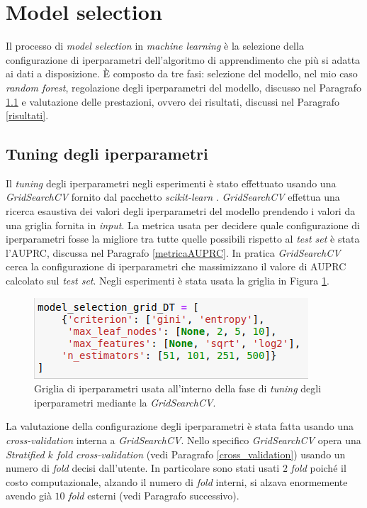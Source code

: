 \documentclass[12pt,italian]{report}
\begin{document}
	
	\section{Model selection}
	Il processo di \textit{model selection} in \textit{machine learning} è la selezione della configurazione di iperparametri dell'algoritmo di apprendimento che più si adatta ai dati a disposizione. È composto da tre fasi: selezione del modello, nel mio caso \textit{random forest}, regolazione degli iperparametri del modello, discusso nel Paragrafo \ref{tuning} e valutazione delle prestazioni, ovvero dei risultati, discussi nel Paragrafo \ref{risultati}.
	
	\subsection{Tuning degli iperparametri}
	\label{tuning}
	Il \textit{tuning} degli iperparametri negli esperimenti è stato effettuato usando una \textit{GridSearchCV} fornito dal pacchetto \textit{scikit-learn} \cite{gridsearchcv}. \textit{GridSearchCV} effettua una ricerca esaustiva dei valori degli iperparametri del modello prendendo i valori da una griglia fornita in \textit{input}. La metrica usata per decidere quale configurazione di iperparametri fosse la migliore tra tutte quelle possibili rispetto al \textit{test set} è stata l'AUPRC, discussa nel Paragrafo \ref{metricaAUPRC}. In pratica \textit{GridSearchCV} cerca la configurazione di iperparametri che massimizzano il valore di AUPRC calcolato sul \textit{test set}. Negli esperimenti è stata usata la griglia in Figura \ref{fig:modelselectiongridrf}.
	
	\begin{figure}[h!]
		\centering
		\includegraphics[width=0.7\linewidth]{immagini/modelSelectionGridRF}
		\caption{Griglia di iperparametri usata all'interno della fase di \textit{tuning} degli iperparametri mediante la \textit{GridSearchCV}.}
		\label{fig:modelselectiongridrf}
	\end{figure}
	
	La valutazione della configurazione degli iperparametri è stata fatta usando una \textit{cross-validation} interna a \textit{GridSearchCV}. Nello specifico \textit{GridSearchCV} opera una \textit{Stratified $k$ fold cross-validation} (vedi Paragrafo \ref{cross_validation}) usando un numero di \textit{fold} decisi dall'utente. In particolare sono stati usati $2$ \textit{fold} poiché il costo computazionale, alzando il numero di \textit{fold} interni, si alzava enormemente avendo già $10$ \textit{fold} esterni (vedi Paragrafo successivo). 
\end{document}
